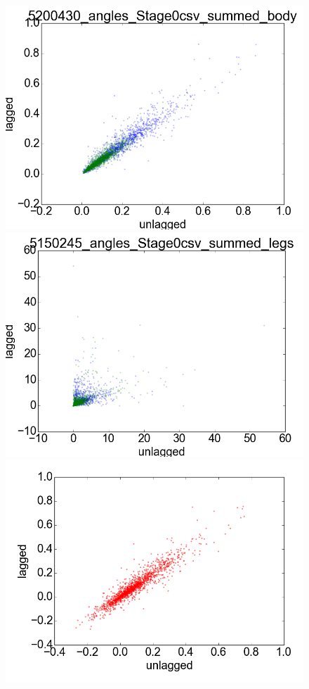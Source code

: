 \documentclass[12pt]{article}
\begin{document}
\begin{figure}
  \centering
  \includegraphics[scale=0.4]{poincare_1}
  \includegraphics[scale=0.4]{poincare_2}
  \includegraphics[scale=0.4]{poincare_3}

\end{figure}
\end{document}
